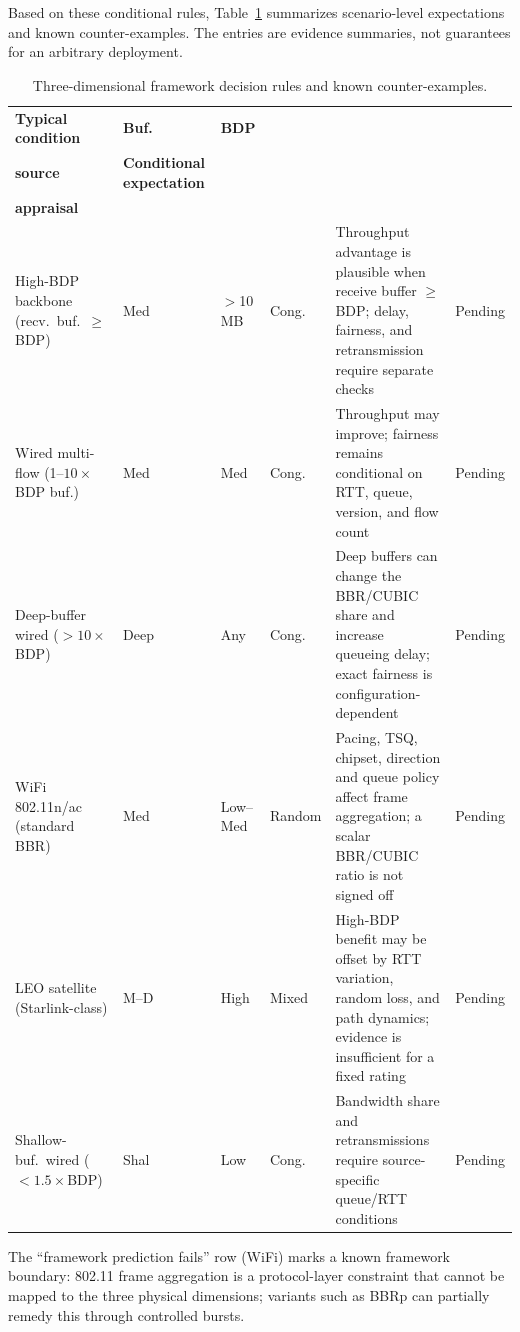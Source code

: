 \documentclass[a4paper,fleqn]{cas-sc}
\begin{document}
Based on these conditional rules, Table~\ref{tab:decision_rules} summarizes
scenario-level expectations and known counter-examples. The entries are evidence
summaries, not guarantees for an arbitrary deployment.

\begin{table}[pos=tbp]
  \caption{Three-dimensional framework decision rules and known counter-examples.}
  \label{tab:decision_rules}
  \small
  \begin{tabularx}{\tblwidth}{@{}p{3.8cm}p{1.0cm}p{1.3cm}p{1.6cm}Xp{1.3cm}@{}}
    \toprule
    \textbf{Typical condition} & \textbf{Buf.} & \textbf{BDP} & \makecell[l]{\textbf{Loss}\\\textbf{source}}
      & \textbf{Conditional expectation} & \makecell[l]{\textbf{Source}\\\textbf{appraisal}} \\
    \midrule
    High-BDP backbone (recv.\ buf.\ $\geq$BDP) & Med & $>$10\,MB & Cong.
      & Throughput advantage is plausible when receive buffer $\geq$BDP; delay, fairness, and retransmission require separate checks & Pending \\
    \midrule
    Wired multi-flow (1--$10\times$BDP buf.) & Med & Med & Cong.
      & Throughput may improve; fairness remains conditional on RTT, queue, version, and flow count & Pending \\
    \midrule
    Deep-buffer wired ($>10\times$BDP) & Deep & Any & Cong.
      & Deep buffers can change the BBR/CUBIC share and increase queueing delay; exact fairness is configuration-dependent & Pending \\
    \midrule
    WiFi 802.11n/ac (standard BBR) & Med & Low--Med & Random
      & Pacing, TSQ, chipset, direction and queue policy affect frame aggregation; a scalar BBR/CUBIC ratio is not signed off & Pending \\
    \midrule
    LEO satellite (Starlink-class) & M--D & High & Mixed
      & High-BDP benefit may be offset by RTT variation, random loss, and path dynamics; evidence is insufficient for a fixed rating & Pending \\
    \midrule
    Shallow-buf.\ wired ($<1.5\times$BDP) & Shal & Low & Cong.
      & Bandwidth share and retransmissions require source-specific queue/RTT conditions & Pending \\
    \bottomrule
  \end{tabularx}
  \begin{tablenotes}
    \small
    \item The ``framework prediction fails'' row (WiFi) marks a known framework boundary:
    802.11 frame aggregation is a protocol-layer constraint that cannot be mapped to the
    three physical dimensions; variants such as BBRp can partially remedy this through
    controlled bursts.
  \end{tablenotes}
\end{table}
\end{document}
